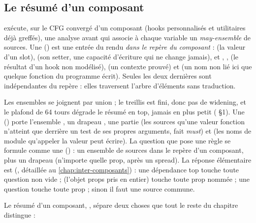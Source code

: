 \subsection{Le résumé d'un composant}

 exécute, sur le CFG convergé d'un composant (hooks personnalisés
et utilitaires déjà greffés), une analyse avant qui associe à chaque variable un
\emph{may-ensemble} de sources. Une  () est
une entrée du rendu \emph{dans le repère du composant} :  (la valeur d'un slot),
 (son setter, une capacité d'écriture qui ne change jamais),
 et , ,  (le résultat d'un hook non
modélisé),  (un contexte prouvé) et  (un nom non lié ici que
quelque fonction du programme écrit). Seules les deux dernières sont indépendantes du repère :
elles traversent l'arbre d'éléments sans traduction.

Les ensembles se joignent par union ; le treillis est fini, donc pas de widening, et le plafond
de 64 tours dégrade le résumé en top, jamais en plus petit ( §1). Une 
() porte l'ensemble , un drapeau ,
une partie  (les sources qu'une valeur fonction n'atteint que derrière un test de ses
propres arguments, fait \emph{must}) et  (les noms de module qu'appeler la valeur
peut écrire). La question que pose une règle se formule comme une 
() : un ensemble de sources dans le repère d'un
composant, plus un drapeau  (\og n'importe quelle prop\fg{}, après un spread). La
réponse élémentaire est  (, détaillée
au \cref{chap:inter-composants}) : une dépendance top touche toute question non vide ;
 (l'objet props pris en entier) touche toute prop nommée ; une question
 touche toute prop ; sinon il faut une source commune.

Le résumé d'un composant, , sépare deux choses que tout le reste du chapitre
distingue :


